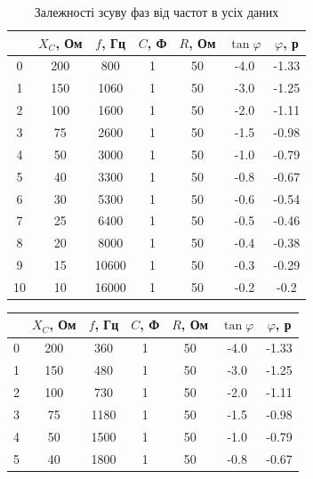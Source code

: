 \documentclass[a4paper,12pt]{article}
\begin{document}
\begin{justify}
\begin{table}[htp]
    \begin{flushright}
		\caption{Залежності зсуву фаз від частот в усіх даних }
	\end{flushright}
\centering
\begin{tabular}{|c|c|c|c|c|c|c|}
\hline
   & $X_C$, Ом& $f$, Гц & $C$, Ф& $R$, Ом& $\tan\varphi$ & $\varphi$, р\\ \hline
0  & 200   & 800   & 1   & 50  & -4.0          & -1.33     \\ \hline
1  & 150   & 1060  & 1   & 50  & -3.0          & -1.25     \\ \hline
2  & 100   & 1600  & 1   & 50  & -2.0          & -1.11     \\ \hline
3  & 75    & 2600  & 1   & 50  & -1.5          & -0.98     \\ \hline
4  & 50    & 3000  & 1   & 50  & -1.0          & -0.79     \\ \hline
5  & 40    & 3300  & 1   & 50  & -0.8          & -0.67     \\ \hline
6  & 30    & 5300  & 1   & 50  & -0.6          & -0.54     \\ \hline
7  & 25    & 6400  & 1   & 50  & -0.5          & -0.46     \\ \hline
8  & 20    & 8000  & 1   & 50  & -0.4          & -0.38     \\ \hline
9  & 15    & 10600 & 1   & 50  & -0.3          & -0.29     \\ \hline
10 & 10    & 16000 & 1   & 50  & -0.2          & -0.2      \\ \hline
\end{tabular}
\end{table}
\begin{table}[htp]
\centering
\begin{tabular}{|c|c|c|c|c|c|c|}
\hline
   & $X_C$, Ом& $f$, Гц & $C$, Ф& $R$, Ом& $\tan\varphi$ & $\varphi$, р\\ \hline
0  & 200   & 360  & 1   & 50  & -4.0          & -1.33     \\ \hline
1  & 150   & 480  & 1   & 50  & -3.0          & -1.25     \\ \hline
2  & 100   & 730  & 1   & 50  & -2.0          & -1.11     \\ \hline
3  & 75    & 1180 & 1   & 50  & -1.5          & -0.98     \\ \hline
4  & 50    & 1500 & 1   & 50  & -1.0          & -0.79     \\ \hline
5  & 40    & 1800 & 1   & 50  & -0.8          & -0.67     \\ \hline

\end{tabular}
\end{table}
\end{justify}
\end{document}
